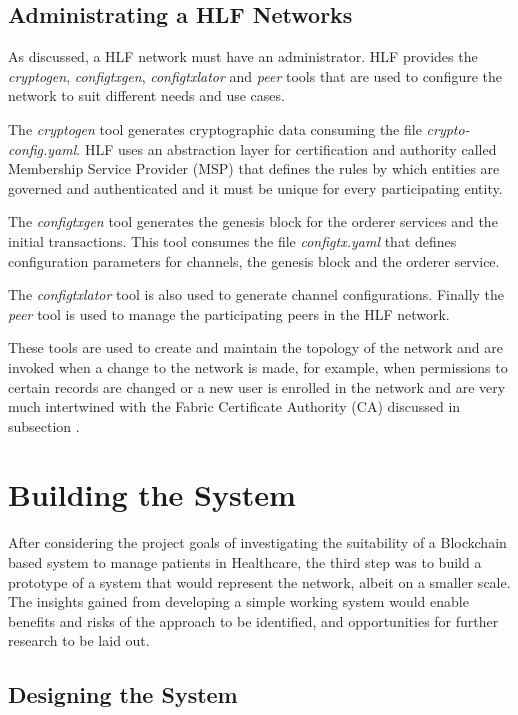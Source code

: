 \subsection{Administrating a HLF Networks}


As discussed, a HLF network must have an administrator. HLF provides the
\textit{cryptogen}, \textit{configtxgen}, \textit{configtxlator} and
\textit{peer} tools that are used to configure the network to suit different
needs and use cases.

The \textit{cryptogen} tool generates cryptographic data consuming the file
\textit{crypto-config.yaml}.  HLF uses an abstraction layer for certification
and authority called Membership Service Provider (MSP) that defines the rules
by which entities are governed and authenticated and it must be unique for
every participating entity.

The \textit{configtxgen} tool generates the genesis block for the orderer
services and the initial transactions.  This tool consumes the file
\textit{configtx.yaml} that defines configuration parameters for channels, the
genesis block and the orderer service.

The \textit{configtxlator} tool is also used to generate channel
configurations.  Finally the \textit{peer} tool is used to manage the
participating peers in the HLF network.

These tools are used to create and maintain the topology of the network and are
invoked when a change to the network is made, for example, when permissions to
certain records are changed or a new user is enrolled in the network and are
very much intertwined with the Fabric Certificate Authority (CA) discussed in
subsection .

\section{Building the System}

After considering the project goals of investigating the suitability of a
Blockchain based system to manage patients in Healthcare, the third step was to
build a prototype of a system that would represent the network, albeit on a
smaller scale. The insights gained from developing a simple working system
would enable benefits and risks of the approach to be identified, and
opportunities for further research to be laid out.

\subsection{Designing the System}

